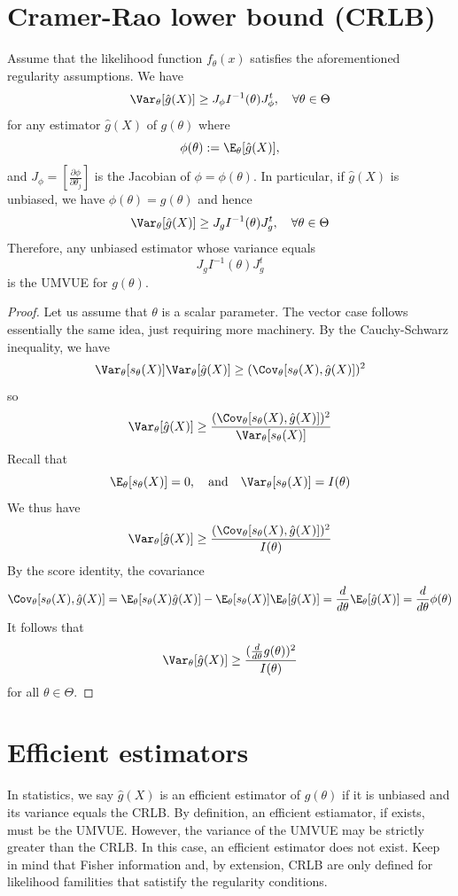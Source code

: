 \section{Cramer-Rao lower bound (CRLB)}
Assume that the likelihood function $f_\theta(x)$ satisfies the aforementioned regularity assumptions. We have
\[
    \Var_\theta[\hat{g}(X)] \geq J_\phi I^{-1} (\theta) J_\phi^t, \quad \forall \theta \in \Theta
\]
for any estimator $\hat{g}(X)$ of $g(\theta)$ where
\[
    \phi(\theta) := \E_\theta[\hat{g}(X)],
\]
and $J_\phi = \left[ \frac{\partial\phi}{\partial \theta_j}\right]$ is the Jacobian of $\phi = \phi(\theta)$. In particular, if $\hat{g}(X)$ is unbiased, we have
$\phi(\theta) = g(\theta)$ and hence
\[
    \Var_\theta[\hat{g}(X)] \geq J_g I^{-1}(\theta) J_g^t, \quad \forall \theta \in \Theta
\]
Therefore, any unbiased estimator whose variance equals
\[
    J_g I^{-1} (\theta) J_g^t
\]
is the UMVUE for $g(\theta)$.

\begin{proof}
    Let us assume that $\theta$ is a scalar parameter. The vector case follows essentially the same idea, just requiring more machinery. By the Cauchy-Schwarz inequality, we have
    \[
        \Var_\theta [s_\theta(X)] \Var_\theta[\hat{g}(X)] \geq (\Cov_\theta[s_\theta(X), \hat{g}(X)])^2
    \]
    so
    \[
        \Var_\theta[\hat{g}(X)] \geq \frac{(\Cov_\theta[s_\theta(X), \hat{g}(X)])^2}{\Var_\theta[s_\theta(X)]}
    \]
    Recall that
    \[
        \E_\theta[s_\theta(X)] = 0, \quad \text{and} \quad \Var_\theta[s_\theta(X)] = I(\theta)
    \]
    We thus have
    \[
        \Var_\theta[\hat{g}(X)] \geq \frac{(\Cov_\theta[s_\theta(X), \hat{g}(X)])^2}{I(\theta)}
    \]
    By the score identity, the covariance
    \[
        \Cov_\theta[s_\theta(X), \hat{g}(X)] = \E_\theta[s_\theta(X)\hat{g}(X)] - \E_\theta[s_\theta(X)] \E_\theta[\hat{g}(X)] = \frac{d}{d\theta} \E_\theta[\hat{g}(X)] = \frac{d}{d\theta} \phi(\theta)
    \]
    It follows that
    \[
        \Var_\theta[\hat{g}(X)] \geq \frac{(\frac{d}{d\theta}g(\theta))^2}{I(\theta)}
    \] for all $\theta \in \Theta$.
\end{proof}
\section{Efficient estimators}
In statistics, we say $\hat{g}(X)$ is an efficient estimator of $g(\theta)$ if it is unbiased and its variance equals the CRLB. By definition, an efficient estiamator, if exists, must be the UMVUE. However, the variance of the UMVUE may be strictly greater than the CRLB. In this case, an efficient estimator does not exist. Keep in mind that Fisher information and, by extension, CRLB are only defined for likelihood familities that satistify the regularity conditions.
